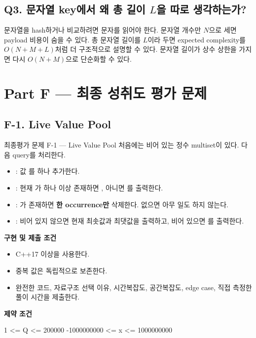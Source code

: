 \subsection{Q3. 문자열 key에서 왜 총 길이 $L$을 따로 생각하는가?}
문자열을 hash하거나 비교하려면 문자를 읽어야 한다. 문자열 개수만 $N$으로 세면 payload 비용이 숨을 수 있다. 총 문자열 길이를 $L$이라 두면 expected complexity를 $O(N+M+L)$처럼 더 구조적으로 설명할 수 있다. 문자열 길이가 상수 상한을 가지면 다시 $O(N+M)$으로 단순화할 수 있다.

\section{Part F --- 최종 성취도 평가 문제}

\subsection{F-1. Live Value Pool}
\begin{problembox}{최종평가 문제 F-1 --- Live Value Pool}
처음에는 비어 있는 정수 multiset이 있다. 다음 query를 처리한다.
\begin{itemize}
\item {}: 값 를 하나 추가한다.
\item {}: 현재 가 하나 이상 존재하면 , 아니면 를 출력한다.
\item {}: 가 존재하면 \textbf{한 occurrence만} 삭제한다. 없으면 아무 일도 하지 않는다.
\item {}: 비어 있지 않으면 현재 최솟값과 최댓값을 출력하고, 비어 있으면 를 출력한다.
\end{itemize}

\textbf{구현 및 제출 조건}
\begin{itemize}
\item C++17 이상을 사용한다.
\item 중복 값은 독립적으로 보존한다.
\item 완전한 코드, 자료구조 선택 이유, 시간복잡도, 공간복잡도, edge case, 직접 측정한 풀이 시간을 제출한다.
\end{itemize}

\textbf{제약 조건}
\begin{TextBlock}
1 <= Q <= 200000
-1000000000 <= x <= 1000000000
\end{TextBlock}
\end{problembox}

